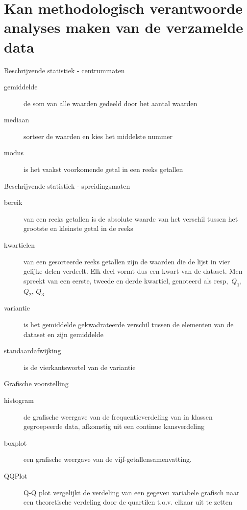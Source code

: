 \section{Kan methodologisch verantwoorde analyses maken van de verzamelde data }
\sectionframe{}

\begin{frame}{Beschrijvende statistiek - centrummaten}
	
	\begin{description}
		\item[gemiddelde] de som van alle waarden gedeeld door het aantal waarden
		\item[mediaan] sorteer de waarden en kies het middelste nummer
		\item[modus] is het vaakst voorkomende getal in een reeks getallen
	\end{description}
\end{frame}

\begin{frame}{Beschrijvende statistiek - spreidingsmaten}
	\begin{description}
		\item[bereik] van een reeks getallen is de absolute waarde van het verschil tussen het grootste en kleinste getal in de reeks
		\item[kwartielen] van een gesorteerde reeks getallen zijn de waarden die de lijst in vier gelijke delen verdeelt. Elk deel vormt dus een kwart van de dataset. Men spreekt van een eerste, tweede en derde kwartiel, genoteerd als resp,~$Q_1$, $Q_2$, $Q_3$
		\item[variantie] is het gemiddelde gekwadrateerde verschil tussen de elementen van de dataset en zijn gemiddelde
		\item[standaardafwijking] is de vierkantswortel van de variantie
	\end{description}
\end{frame}

\begin{frame}{Grafische voorstelling}
	\begin{description}
		\item[histogram] de grafische weergave van de frequentieverdeling van in klassen gegroepeerde data, afkomstig uit een continue kansverdeling 
		\item[boxplot] een grafische weergave van de vijf-getallensamenvatting.
		\item[QQPlot] Q-Q plot vergelijkt de verdeling van een gegeven variabele grafisch naar een theoretische verdeling door de quartilen t.o.v. elkaar uit te zetten 
	\end{description}
\end{frame}

